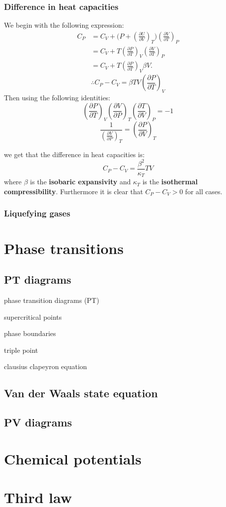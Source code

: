\documentclass{article}
\begin{document}
\newpage

\subsubsection{Difference in heat capacities}
We begin with the following expression:
\begin{align*}
    C_P
    &=C_V+\bigl(P+
    \left(\frac{\partial U}{\partial V}\right)_T\bigl)
    \left(\frac{\partial V}{\partial T}\right)_P \\
    &=C_V+T\left(\frac{\partial P}{\partial T}\right)_V
    \left(\frac{\partial V}{\partial T}\right)_P \\
    &=C_V+T\left(\frac{\partial P}{\partial T}\right)_V
    \beta V.
\end{align*}
$$\therefore C_P-C_V=\beta TV
\left(\frac{\partial P}{\partial T}\right)_V$$
Then using the following identities:
$$\left(\frac{\partial P}{\partial T}\right)_V
\left(\frac{\partial V}{\partial P}\right)_T
\left(\frac{\partial T}{\partial V}\right)_P=-1$$
$$\frac{1}{\left(\frac{\partial V}{\partial P}\right)_T}
=\left(\frac{\partial P}{\partial V}\right)_T$$

we get that the difference in heat capacities is:
$$C_P-C_V=\frac{\beta^2}{\kappa_T} TV$$
where $\beta$ is the \textbf{isobaric expansivity}
and $\kappa_T$ is the \textbf{isothermal compressibility}.
Furthermore it is clear that $C_P-C_V>0$ for all cases.

\subsubsection{Liquefying gases}

\newpage

\section{Phase transitions}

\subsection{PT diagrams}
phase transition diagrams (PT)

supercritical points

phase boundaries

triple point

clausius clapeyron equation

\subsection{Van der Waals state equation}

\subsection{PV diagrams}

\newpage

\section{Chemical potentials}

\newpage

\section{Third law}
\end{document}
